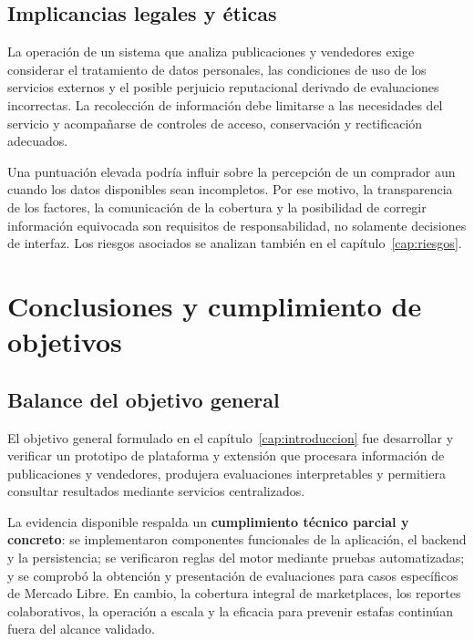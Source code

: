 \subsection{Implicancias legales y éticas}\label{subsec:ml-implicancias-eticas}

La operación de un sistema que analiza publicaciones y vendedores exige considerar el tratamiento de datos personales, las condiciones de uso de los servicios externos y el posible perjuicio reputacional derivado de evaluaciones incorrectas. La recolección de información debe limitarse a las necesidades del servicio y acompañarse de controles de acceso, conservación y rectificación adecuados.

Una puntuación elevada podría influir sobre la percepción de un comprador aun cuando los datos disponibles sean incompletos. Por ese motivo, la transparencia de los factores, la comunicación de la cobertura y la posibilidad de corregir información equivocada son requisitos de responsabilidad, no solamente decisiones de interfaz. Los riesgos asociados se analizan también en el capítulo~\ref{cap:riesgos}.

\section{Conclusiones y cumplimiento de objetivos}\label{sec:ml-conclusiones}

\subsection{Balance del objetivo general}\label{subsec:ml-balance-general}

El objetivo general formulado en el capítulo~\ref{cap:introduccion} fue desarrollar y verificar un prototipo de plataforma y extensión que procesara información de publicaciones y vendedores, produjera evaluaciones interpretables y permitiera consultar resultados mediante servicios centralizados.

La evidencia disponible respalda un \textbf{cumplimiento técnico parcial y concreto}: se implementaron componentes funcionales de la aplicación, el backend y la persistencia; se verificaron reglas del motor mediante pruebas automatizadas; y se comprobó la obtención y presentación de evaluaciones para casos específicos de Mercado Libre. En cambio, la cobertura integral de marketplaces, los reportes colaborativos, la operación a escala y la eficacia para prevenir estafas continúan fuera del alcance validado.

